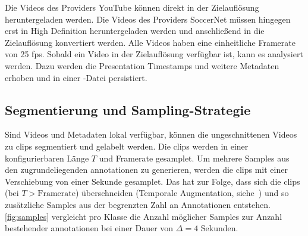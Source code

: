 Die Videos des Providers YouTube können direkt in der Zielauflösung heruntergeladen werden.
Die Videos des Providers SoccerNet müssen hingegen erst in High Definition heruntergeladen werden und anschließend in die Zielauflösung konvertiert werden.
Alle Videos haben eine einheitliche Framerate von 25 \gls{fps}.
Sobald ein Video in der Zielauflösung verfügbar ist, kann es analysiert werden.
Dazu werden die Presentation Timestamps und weitere Metadaten erhoben und in einer -Datei persistiert.

\subsection{Segmentierung und Sampling-Strategie}
\label{subsec:segmentierung-und-sampling-strategie}

Sind Videos und Metadaten lokal verfügbar, können die ungeschnittenen Videos zu \glspl{clip} segmentiert und gelabelt werden.
Die \glspl{clip} werden in einer konfigurierbaren Länge $T$ und Framerate gesamplet.
Um mehrere Samples aus den zugrundeliegenden \gls{annotationen} zu generieren, werden die \glspl{clip} mit einer Verschiebung von einer Sekunde gesamplet.
Das hat zur Folge, dass sich die \glspl{clip} (bei $T > \text{Framerate}$) überschneiden (Temporale Augmentation, siehe~\cite{Giancola18}) und so zusätzliche Samples aus der begrenzten Zahl an Annotationen entstehen.
\autoref{fig:samples} vergleicht pro Klasse die Anzahl möglicher Samples zur Anzahl bestehender \gls{annotationen} bei einer Dauer von $\Delta=4$ Sekunden.

